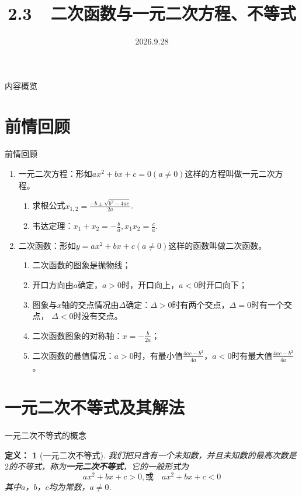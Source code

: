 \documentclass[aspectratio=169,13pt,fleqn,t] {beamer}
\title[2.3~一元二次不等式]{2.3~~二次函数与一元二次方程、不等式}
\author[好好学习，努力向上]{}
\institute{}
\date{2026.9.28}
\newtheorem*{definate}{定义：}
\begin{document}
\begin{frame}{}
	\titlepage
\end{frame}

\begin{frame}{内容概览}
	\tableofcontents
\end{frame}

\section{前情回顾}
\begin{frame}{前情回顾}
	
	\begin{enumerate}
		\item 一元二次方程：形如$ax^2+bx+c=0(a\neq 0)$这样的方程叫做一元二次方程。
		\begin{enumerate}[(1)]
			\item 求根公式$x_{1,2}=\frac{-b\pm \sqrt{b^2-4ac}}{2a}$.
			\item 韦达定理：$x_1+x_2=-\frac{b}{a},x_1x_2=\frac{c}{a}$.
		\end{enumerate}
		\item 二次函数：形如$y=ax^2 + bx + c(a\neq 0)$这样的函数叫做二次函数。
		\begin{enumerate}[(1)]
			\item 二次函数的图象是抛物线；
			\item 开口方向由$a$确定，$a>0$时，开口向上，$a<0$时开口向下；
			\item 图象与$x$轴的交点情况由$\Delta$确定：$\Delta>0$时有两个交点，$\Delta=0$时有一个交点，
			$\Delta<0$时没有交点。
			\item 二次函数图象的对称轴：$x=-\frac{b}{2a}$；
			\item 二次函数的最值情况：$a>0$时，有最小值$\frac{4ac-b^2}{4a}$，$a<0$时有最大值$\frac{4ac-b^2}{4a}$。
		\end{enumerate}
	\end{enumerate}
	
\end{frame}

\section{一元二次不等式及其解法}
\begin{frame}[t]{一元二次不等式的概念}
	\begin{definate}[一元二次不等式]
		我们把只含有一个未知数，并且未知数的最高次数是$2$的不等式，称为\textbf{一元二次不等式}，它的一般形式为
		\[
		ax^2+bx+c>0,\text{或}\quad ax^2+bx+c<0
		\]
		其中$a$，$b$，$c$均为常数，$a\neq 0$.
	\end{definate}
	
	
\end{frame}
\end{document}
